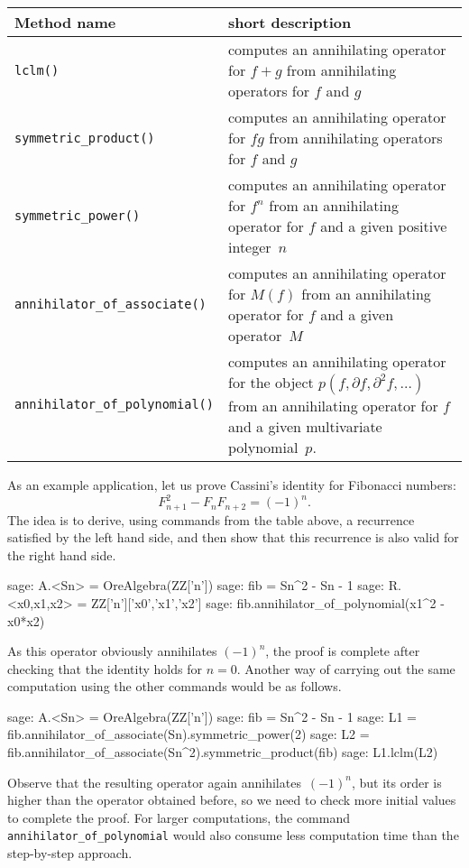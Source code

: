 \documentclass[11pt]{amsart}
\begin{document}
\begin{center}
\begin{tabular}{|l|p{.55\hsize}|}
\hline
Method name & short description \\\hline
\verb|lclm()| & computes an annihilating operator for $f+g$ from annihilating operators for $f$ and $g$ \\
\verb|symmetric_product()| & computes an annihilating operator for $fg$ from annihilating operators for $f$ and $g$ \\
\verb|symmetric_power()| & computes an annihilating operator for $f^n$ from an annihilating operator for $f$ and a given positive integer~$n$\\ 
\verb|annihilator_of_associate()| & computes an annihilating operator for $M(f)$ from an annihilating operator for $f$ and a given operator~$M$\\ 
\verb|annihilator_of_polynomial()| & computes an annihilating operator for the object $p(f,\partial f,\partial^2 f,\dots)$ from an annihilating operator for $f$ and a given multivariate polynomial~$p$. \\
\hline
\end{tabular}
\end{center}

As an example application, let us prove Cassini's identity for Fibonacci
numbers: 
\[
  F_{n+1}^2 - F_nF_{n+2}=(-1)^n.
\]
The idea is to derive, using commands from the table above, a recurrence
satisfied by the left hand side, and then show that this recurrence is also
valid for the right hand side.

\begin{sageexample}
  sage: A.<Sn> = OreAlgebra(ZZ['n'])
  sage: fib = Sn^2 - Sn - 1
  sage: R.<x0,x1,x2> = ZZ['n']['x0','x1','x2']
  sage: fib.annihilator_of_polynomial(x1^2 - x0*x2) 
\end{sageexample}

As this operator obviously annihilates $(-1)^n$, the proof is complete after
checking that the identity holds for $n=0$. Another way of carrying out the
same computation using the other commands would be as follows.

\begin{sageexample}
  sage: A.<Sn> = OreAlgebra(ZZ['n'])
  sage: fib = Sn^2 - Sn - 1
  sage: L1 = fib.annihilator_of_associate(Sn).symmetric_power(2)
  sage: L2 = fib.annihilator_of_associate(Sn^2).symmetric_product(fib)
  sage: L1.lclm(L2)
\end{sageexample}

Observe that the resulting operator again annihilates~$(-1)^n$, but its order is
higher than the operator obtained before, so we need to check more initial
values to complete the proof. For larger computations, the command
\verb|annihilator_of_polynomial| would also consume less computation time than
the step-by-step approach.
\end{document}

